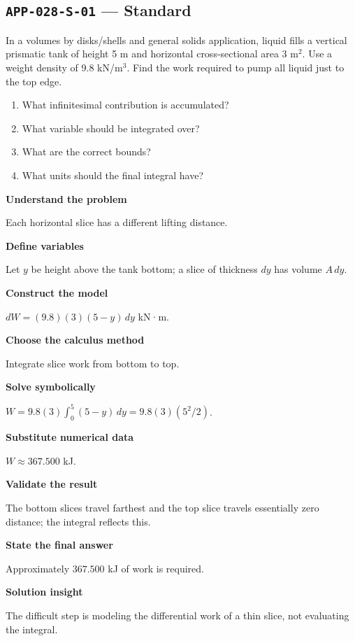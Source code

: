 \documentclass[11pt]{book}
\newcommand{\pid}[1]{\texttt{#1}}
\begin{document}
\subsection*{\pid{APP-028-S-01} — Standard}
\begin{problembox}
In a volumes by disks/shells and general solids application, liquid fills a vertical prismatic tank of height 5 m and horizontal cross-sectional area 3 m$^2$. Use a weight density of 9.8 kN/m$^3$. Find the work required to pump all liquid just to the top edge.
\end{problembox}
\begin{promptbox}\begin{enumerate}
\item What infinitesimal contribution is accumulated?
\item What variable should be integrated over?
\item What are the correct bounds?
\item What units should the final integral have?
\end{enumerate}\end{promptbox}
\begin{solutionbox}
\textbf{Understand the problem}\par Each horizontal slice has a different lifting distance.\par\medskip
\textbf{Define variables}\par Let $y$ be height above the tank bottom; a slice of thickness $dy$ has volume $A\,dy$.\par\medskip
\textbf{Construct the model}\par $dW=(9.8)(3)(5-y)\,dy$ kN·m.\par\medskip
\textbf{Choose the calculus method}\par Integrate slice work from bottom to top.\par\medskip
\textbf{Solve symbolically}\par $W=9.8(3)\int_0^{5}(5-y)\,dy=9.8(3)(5^2/2)$.\par\medskip
\textbf{Substitute numerical data}\par $W\approx 367.500$ kJ.\par\medskip
\textbf{Validate the result}\par The bottom slices travel farthest and the top slice travels essentially zero distance; the integral reflects this.\par\medskip
\textbf{State the final answer}\par Approximately $367.500$ kJ of work is required.\par\medskip
\textbf{Solution insight}\par The difficult step is modeling the differential work of a thin slice, not evaluating the integral.\par\medskip
\end{solutionbox}
\end{document}
